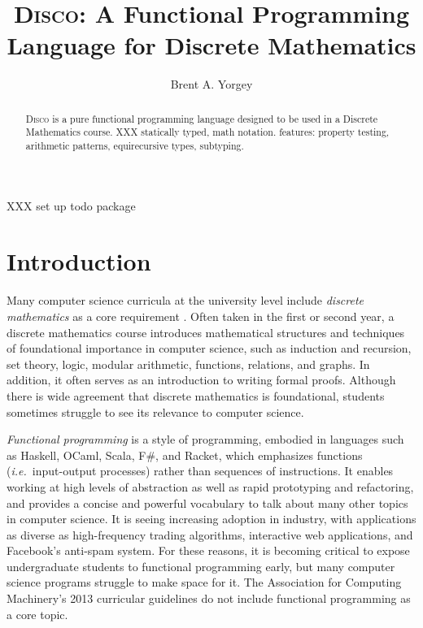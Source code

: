 \documentclass[submission,copyright,creativecommons]{eptcs}
\title{\textsc{Disco}: A Functional Programming Language for Discrete Mathematics}
\author{Brent A. Yorgey
\institute{Hendrix College\\ Conway, Arkansas, USA}
\email{yorgey@hendrix.edu}
}
\newcommand{\disco}{\textsc{Disco}\xspace}
\begin{document}
\maketitle

XXX set up todo package

\begin{abstract}
  \disco is a pure functional programming language designed to be used
  in a Discrete Mathematics course.  XXX statically typed, math
  notation.
  features: property testing, arithmetic patterns, equirecursive
  types, subtyping.
\end{abstract}

\section{Introduction}
\label{sec:introduction}

Many computer science curricula at the university level include
\emph{discrete mathematics} as a core requirement \cite{ACM:2013}.
Often taken in the first or second year, a discrete mathematics course
introduces mathematical structures and techniques of foundational
importance in computer science, such as induction and recursion, set
theory, logic, modular arithmetic, functions, relations, and graphs.
In addition, it often serves as an introduction to writing formal
proofs.  Although there is wide agreement that discrete mathematics is
foundational, students sometimes struggle to see its relevance to
computer science.

\emph{Functional programming} is a style of programming, embodied in
languages such as Haskell, OCaml, Scala, F\#, and Racket, which
emphasizes functions (\emph{i.e.}\ input-output processes) rather than
sequences of instructions. It enables working at high levels of
abstraction as well as rapid prototyping and refactoring, and provides
a concise and powerful vocabulary to talk about many other topics in
computer science. It is seeing increasing adoption in industry, with
applications as diverse as high-frequency trading algorithms,
interactive web applications, and Facebook's anti-spam system.  For
these reasons, it is becoming critical to expose undergraduate
students to functional programming early, but many computer science
programs struggle to make space for it.  The Association for Computing
Machinery's 2013 curricular guidelines \cite{ACM:2013} do not include
functional programming as a core topic.
\end{document}

